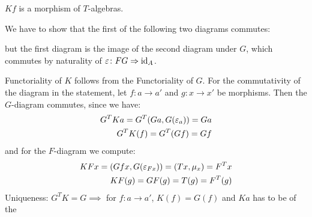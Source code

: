 \begin{beweis}
    \begin{claim}
        $Kf$ is a morphism of $T$-algebras.
    \end{claim}
    \begin{smallproof}
        We have to show that the first of the following two diagrams commutes:
        \begin{figure}[H]
        \centering
        \begin{subfigure}{0.4\textwidth}
        \centering
        \end{subfigure}
        \hspace{2em}
        \begin{subfigure}{0.4\textwidth}
        \centering
        \end{subfigure}
        \end{figure}
        but the first diagram is the image of the second diagram under $G$,
        which commutes by naturality of $\varepsilon \colon FG \Rightarrow \operatorname{id}_A$.
    \end{smallproof}
    Functoriality of $K$ follows from the Functoriality of $G$.
    For the commutativity of the diagram in the statement, let $f \colon a \to a'$ and $g \colon x \to x'$ 
    be morphisms. Then the $G$-diagram commutes, since we have:
    \begin{align*}
        G^TKa = G^T(Ga,G(\varepsilon_a)) = Ga \\
        G^TK(f) = G^T(Gf) = Gf
    \end{align*}
    and for the $F$-diagram we compute:
    \begin{align*}
        KFx = (Gfx,G(\varepsilon_{Fx})) = (Tx,\mu_x) = F^Tx \\
        KF(g) = GF(g) = T(g) = F^T(g)
    \end{align*}
    Uniqueness: $G^TK = G \implies$ for $f \colon a \to a'$, $K(f) = G(f)$ and $Ka$ has to be of the

\end{beweis}
